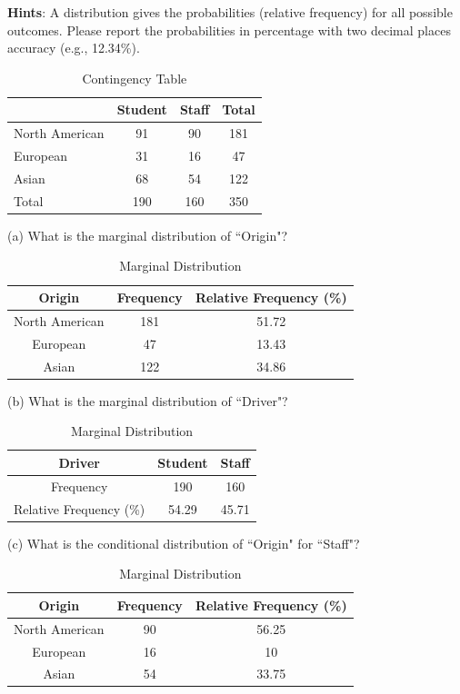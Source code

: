 \documentclass[letterpaper,12pt]{article}
\begin{document}
\begin{enumerate}
\textbf{Hints}: A distribution gives the probabilities (relative frequency) for all possible outcomes. Please report the probabilities in percentage with two decimal places accuracy (e.g., 12.34\%).

\begin{table}[h]
\centering
\renewcommand{\arraystretch}{1.2}
\begin{tabular}{|l|ccc|} \hline
  & Student & Staff & Total\\ \hline
North American & 91 & 90 & 181\\
European & 31 & 16 & 47 \\
Asian & 68 & 54 & 122\\ \hline
Total & 190 & 160 & 350\\ \hline
\end{tabular}
\caption{Contingency Table}
\label{tab1}
\end{table}
\newpage
\subitem(a) What is the marginal distribution of ``Origin"? 

\begin{table}[h]
\centering
\renewcommand{\arraystretch}{1.2}
\begin{tabular}{|ccc|} \hline
 Origin & Frequency & Relative Frequency (\%)\\ \hline
North American & 181 & 51.72\\
European & 47 & 13.43 \\
Asian & 122 & 34.86 \\\hline
\end{tabular}
\caption{Marginal Distribution}
\label{tab1}
\end{table}

\subitem(b) What is the marginal distribution of ``Driver"?

\begin{table}[h]
\centering
\renewcommand{\arraystretch}{1.2}
\begin{tabular}{|ccc|} \hline
Driver & Student & Staff\\ \hline
Frequency & 190 & 160\\
Relative Frequency (\%) & 54.29 & 45.71\\ \hline
\end{tabular}
\caption{Marginal Distribution}
\label{tab1}
\end{table}

\subitem(c) What is the conditional distribution of ``Origin" for ``Staff"?

\begin{table}[h]
\centering
\renewcommand{\arraystretch}{1.2}
\begin{tabular}{|ccc|} \hline
 Origin & Frequency & Relative Frequency (\%)\\ \hline
North American & 90 & 56.25\\
European & 16 & 10 \\
Asian & 54 & 33.75 \\\hline
\end{tabular}
\caption{Marginal Distribution}
\label{tab1}
\end{table}


\end{enumerate}
\end{document}
